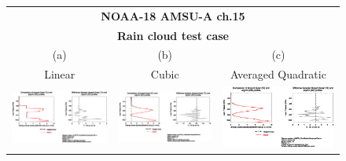 \begin{figure}[htp]
  \centering
  \begin{tabular}{c c c}
    \multicolumn{3}{c}{\qquad\sffamily\textbf{NOAA-18 AMSU-A ch.15}}\\
    \multicolumn{3}{c}{\qquad\sffamily\textbf{Rain cloud test case}}\\
    \qquad\textsf{(a)} & \qquad\textsf{(b)}  & \qquad\textsf{(c)} \\
    \qquad\textsf{Linear} & \qquad\textsf{Cubic}  & \qquad\textsf{Averaged Quadratic} \\
    \includegraphics[bb=90 400 300 540,clip,scale=0.7]{graphics/Cloud/AD/amsua_n18.ch15.RAIN.NLIN.dw_dReff.eps} &
    \includegraphics[bb=90 400 300 540,clip,scale=0.7]{graphics/Cloud/AD/amsua_n18.ch15.RAIN.NCUBIC.dw_dReff.eps}  &
    \includegraphics[bb=90 400 300 540,clip,scale=0.7]{graphics/Cloud/AD/amsua_n18.ch15.RAIN.AVGQUAD.dw_dReff.eps} \\

\end{tabular}
\end{figure}

